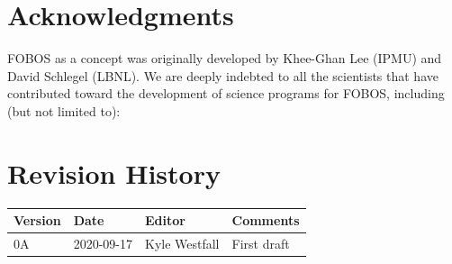 \documentclass[11pt,a4paper,twoside,onecolumn,openany,final,oldfontcommands]{memoir}
\begin{document}
\newpage

\chapter*{Acknowledgments}

FOBOS as a concept was originally developed by Khee-Ghan Lee (IPMU) and David Schlegel (LBNL).  We are deeply indebted to all the scientists that have contributed toward the development of science programs for FOBOS, including (but not limited to): 

\newpage

\chapter*{Revision History}

\begin{table}[hp]{%
\begin{tabular}{l | l | l |  p{22pc}} \toprule
\textbf{Version} & \textbf{Date} & \textbf{Editor} & \textbf{Comments} \\ \midrule
0A & 2020-09-17 & Kyle Westfall & First draft \\ \bottomrule
\end{tabular}}
\end{table}



\end{document}
